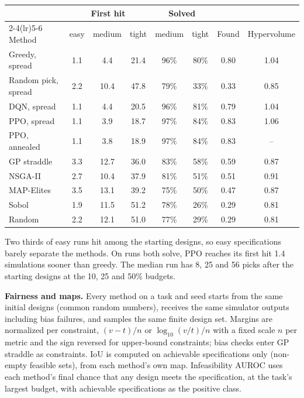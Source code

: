 \documentclass[10pt]{article}
\begin{document}
\begin{center}\footnotesize
\begin{tabular}{lccccccc}
\toprule
& \multicolumn{3}{c}{First hit} & \multicolumn{2}{c}{Solved} & & \\
\cmidrule(lr){2-4}\cmidrule(lr){5-6}
Method & easy & medium & tight & medium & tight & Found & Hypervolume \\
\midrule
Greedy, spread & 1.1 & 4.4 & 21.4 & 96\% & 80\% & 0.80 & 1.04 \\
Random pick, spread & 2.2 & 10.4 & 47.8 & 79\% & 33\% & 0.33 & 0.85 \\
DQN, spread & 1.1 & 4.4 & 20.5 & 96\% & 81\% & 0.79 & 1.04 \\
PPO, spread & 1.1 & 3.9 & 18.7 & 97\% & 84\% & 0.83 & 1.06 \\
PPO, annealed & 1.1 & 3.8 & 18.9 & 97\% & 84\% & 0.83 & -- \\
GP straddle & 3.3 & 12.7 & 36.0 & 83\% & 58\% & 0.59 & 0.87 \\
NSGA-II & 2.7 & 10.4 & 37.9 & 81\% & 51\% & 0.51 & 0.91 \\
MAP-Elites & 3.5 & 13.1 & 39.2 & 75\% & 50\% & 0.47 & 0.87 \\
Sobol & 1.9 & 11.5 & 51.2 & 78\% & 26\% & 0.29 & 0.81 \\
Random & 2.2 & 12.1 & 51.0 & 77\% & 29\% & 0.29 & 0.81 \\
\bottomrule
\end{tabular}
\end{center}
Two thirds of easy runs hit among the starting designs, so easy specifications barely separate the methods. On runs
both solve, PPO reaches its first hit 1.4 simulations sooner than greedy. The median run has 8, 25 and 56 picks after
the starting designs at the 10, 25 and 50\% budgets.

\textbf{Fairness and maps.} Every method on a task and seed starts from the same initial designs (common random
numbers), receives the same simulator outputs including bias failures, and samples the same finite design set.
Margins are normalized per constraint, $(v - t)/n$ or $\log_{10}(v/t)/n$ with a fixed scale $n$ per metric and the sign
reversed for upper-bound constraints; bias
checks enter GP straddle as constraints. IoU is computed on achievable specifications only (non-empty feasible sets),
from each method's own map. Infeasibility AUROC uses each method's final chance that any design meets the
specification, at the task's largest budget, with achievable specifications as the positive class.
\end{document}
